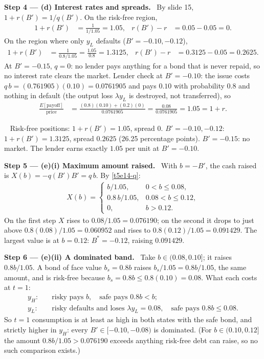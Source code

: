 \documentclass[11pt,a4paper]{article}
\newcommand{\step}[2]{\par\medskip\noindent\textbf{Step #1 --- #2.}~}
\newcommand{\answer}[1]{\par\smallskip\noindent\fbox{\textbf{Answer #1.}}~}
\begin{document}
\step{4}{(d) Interest rates and spreads} By slide 15, $1+r(B')=1/q(B')$. On the risk-free region,
\begin{align}
  1+r(B') &= \frac{1}{1/1.05} = 1.05, & r(B')-r &= 0.05-0.05 = 0. \nonumber
\end{align}
On the region where only $y_L$ defaults ($B'=-0.10,-0.12$),
\begin{align}
  1+r(B') &= \frac{1}{0.8/1.05} = \frac{1.05}{0.8} = 1.3125, & r(B')-r &= 0.3125-0.05 = 0.2625. \nonumber
\end{align}
At $B'=-0.15$, $q=0$: no lender pays anything for a bond that is never repaid, so no interest rate clears the market.
Lender check at $B'=-0.10$: the issue costs $q\,b=(0.761905)(0.10)=0.0761905$ and pays $0.10$ with probability $0.8$ and nothing
in default (the output loss $\lambda y_L$ is destroyed, not transferred), so
\begin{align}
  \frac{E[\text{payoff}]}{\text{price}} &= \frac{(0.8)(0.10)+(0.2)(0)}{0.0761905} = \frac{0.08}{0.0761905} = 1.05 = 1+r. \nonumber
\end{align}

\answer{(d)} Risk-free positions: $1+r(B')=1.05$, spread $0$. $B'=-0.10,-0.12$: $1+r(B')=1.3125$, spread $0.2625$ (26.25 percentage points).
$B'=-0.15$: no market. The lender earns exactly $1.05$ per unit at $B'=-0.10$.

\step{5}{(e)(i) Maximum amount raised} With $b=-B'$, the cash raised is $X(b)=-q(B')B'=q\,b$. By \eqref{t5e14-q}:
\begin{align}
  X(b) = \begin{cases} b/1.05, & 0<b\le0.08,\\ 0.8\,b/1.05, & 0.08<b\le0.12,\\ 0, & b>0.12. \end{cases} \nonumber
\end{align}
On the first step $X$ rises to $0.08/1.05=0.076190$; on the second it drops to just above $0.8(0.08)/1.05=0.060952$ and rises to $0.8(0.12)/1.05=0.091429$.
The largest value is at $b=0.12$: $B^*=-0.12$, raising $0.091429$.

\step{6}{(e)(ii) A dominated band} Take $b\in(0.08,0.10]$; it raises $0.8b/1.05$. A bond of face value $b_s=0.8b$ raises $b_s/1.05=0.8b/1.05$, the same
amount, and is risk-free because $b_s=0.8b\le0.8(0.10)=0.08$. What each costs at $t=1$:
\begin{align}
  y_H:&\quad \text{risky pays } b, \quad \text{safe pays } 0.8b < b; \nonumber\\
  y_L:&\quad \text{risky defaults and loses } \lambda y_L = 0.08, \quad \text{safe pays } 0.8b \le 0.08. \nonumber
\end{align}
So $t=1$ consumption is at least as high in both states with the safe bond, and strictly higher in $y_H$: every $B'\in[-0.10,-0.08)$ is dominated.
(For $b\in(0.10,0.12]$ the amount $0.8b/1.05>0.076190$ exceeds anything risk-free debt can raise, so no such comparison exists.)
\end{document}
